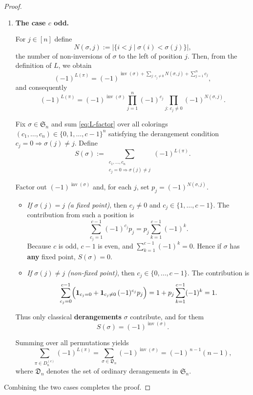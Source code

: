 \documentclass[10pt,a4paper]{amsart}
\begin{document}
\begin{proof}
\begin{enumerate}
\item \textbf{The case $c$ odd.}

For $j\in[n]$ define
\[
N(\sigma,j):=\bigl|\{i<j\mid \sigma(i)<\sigma(j)\}\bigr|,
\]
the number of non-inversions of $\sigma$ to the left of position $j$.  
Then, from the definition of $L$, we obtain
\[
(-1)^{L(\pi)}=(-1)^{\operatorname{inv}(\sigma)
+\sum_{j:\,c_j\neq 0}N(\sigma,j)
+\sum_{j=1}^{n}c_j},
\]
and consequently
\begin{equation}\label{eq:L-factor}
(-1)^{L(\pi)}
=
(-1)^{\operatorname{inv}(\sigma)}
\prod_{j=1}^{n}(-1)^{c_j}
\prod_{j:\,c_j\neq 0}(-1)^{N(\sigma,j)}.
\end{equation}

Fix $\sigma\in \mathfrak{S}_n$ and sum \eqref{eq:L-factor} over all colorings
$(c_1,\dots,c_n)\in\{0,1,\dots,c-1\}^n$ satisfying the derangement condition
$c_j=0\Rightarrow\sigma(j)\neq j$.  
Define
\[
S(\sigma):=\sum_{\substack{c_1,\dots,c_n\\ c_j=0\Rightarrow\sigma(j)\neq j}}
(-1)^{L(\pi)}.
\]

Factor out $(-1)^{\operatorname{inv}(\sigma)}$ and, for each $j$, set $p_j=(-1)^{N(\sigma,j)}$.

\begin{itemize}
\item \textit{If $\sigma(j)=j$ (a fixed point)}, then $c_j\neq0$ and $c_j\in\{1,\dots,c-1\}$.  
The contribution from such a position is
\[
\sum_{c_j=1}^{c-1}(-1)^{c_j} p_j
=p_j\sum_{k=1}^{c-1}(-1)^{k}.
\]
Because $c$ is odd, $c-1$ is even, and $\sum_{k=1}^{c-1}(-1)^k=0$.  
Hence if $\sigma$ has \textbf{any} fixed point, $S(\sigma)=0$.

\item \textit{If $\sigma(j)\neq j$ (non-fixed point)}, then $c_j\in\{0,\dots,c-1\}$.  
The contribution is
\[
\sum_{c_j=0}^{c-1}
\Bigl(\mathbf{1}_{c_j=0}
+\mathbf{1}_{c_j\neq0}\,(-1)^{c_j}p_j\Bigr)
=1+p_j\sum_{k=1}^{c-1}(-1)^k=1.
\]
\end{itemize}

Thus only classical \textbf{derangements} $\sigma$ contribute, and for them
\[
S(\sigma)=(-1)^{\operatorname{inv}(\sigma)}.
\]

\medskip

Summing over all permutations yields
\[
\sum_{\pi\in D_n^{(c)}}(-1)^{L(\pi)}
=\sum_{\sigma\in\mathfrak{D}_n}(-1)^{\operatorname{inv}(\sigma)}=(-1)^{\,n-1}(n-1),
\]
where $\mathfrak{D}_n$ denotes the set of ordinary derangements in $\mathfrak{S}_n$.
\end{enumerate}

Combining the two cases completes the proof.
\end{proof}
\end{document}
